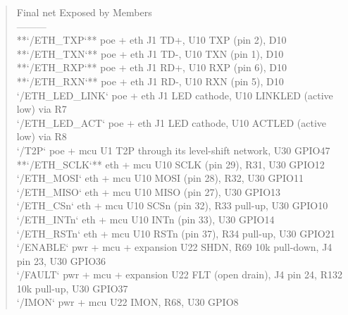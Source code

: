 \documentclass[11pt,a4paper]{article}
\begin{document}
\begin{quote}\small\ttfamily\raggedright
\textbar{} Final net \textbar{} Exposed by \textbar{} Members \textbar{}\\
\textbar{}---\textbar{}---\textbar{}---\textbar{}\\
\textbar{} {*}{*}`/ETH\_TXP`{*}{*} \textbar{} poe + eth \textbar{} J1 TD+, U10 TXP (pin 2), D10 \textbar{}\\
\textbar{} {*}{*}`/ETH\_TXN`{*}{*} \textbar{} poe + eth \textbar{} J1 TD-, U10 TXN (pin 1), D10 \textbar{}\\
\textbar{} {*}{*}`/ETH\_RXP`{*}{*} \textbar{} poe + eth \textbar{} J1 RD+, U10 RXP (pin 6), D10 \textbar{}\\
\textbar{} {*}{*}`/ETH\_RXN`{*}{*} \textbar{} poe + eth \textbar{} J1 RD-, U10 RXN (pin 5), D10 \textbar{}\\
\textbar{} `/ETH\_LED\_LINK` \textbar{} poe + eth \textbar{} J1 LED cathode, U10 LINKLED (active low) via R7 \textbar{}\\
\textbar{} `/ETH\_LED\_ACT` \textbar{} poe + eth \textbar{} J1 LED cathode, U10 ACTLED (active low) via R8 \textbar{}\\
\textbar{} `/T2P` \textbar{} poe + mcu \textbar{} U1 T2P through its level-shift network, U30 GPIO47 \textbar{}\\
\textbar{} {*}{*}`/ETH\_SCLK`{*}{*} \textbar{} eth + mcu \textbar{} U10 SCLK (pin 29), R31, U30 GPIO12 \textbar{}\\
\textbar{} `/ETH\_MOSI` \textbar{} eth + mcu \textbar{} U10 MOSI (pin 28), R32, U30 GPIO11 \textbar{}\\
\textbar{} `/ETH\_MISO` \textbar{} eth + mcu \textbar{} U10 MISO (pin 27), U30 GPIO13 \textbar{}\\
\textbar{} `/ETH\_CSn` \textbar{} eth + mcu \textbar{} U10 SCSn (pin 32), R33 pull-up, U30 GPIO10 \textbar{}\\
\textbar{} `/ETH\_INTn` \textbar{} eth + mcu \textbar{} U10 INTn (pin 33), U30 GPIO14 \textbar{}\\
\textbar{} `/ETH\_RSTn` \textbar{} eth + mcu \textbar{} U10 RSTn (pin 37), R34 pull-up, U30 GPIO21 \textbar{}\\
\textbar{} `/ENABLE` \textbar{} pwr + mcu + expansion \textbar{} U22 SHDN, R69 10k pull-down, J4 pin 23, U30 GPIO36 \textbar{}\\
\textbar{} `/FAULT` \textbar{} pwr + mcu + expansion \textbar{} U22 FLT (open drain), J4 pin 24, R132 10k pull-up, U30 GPIO37 \textbar{}\\
\textbar{} `/IMON` \textbar{} pwr + mcu \textbar{} U22 IMON, R68, U30 GPIO8 \textbar{}\\

\end{quote}
\end{document}
